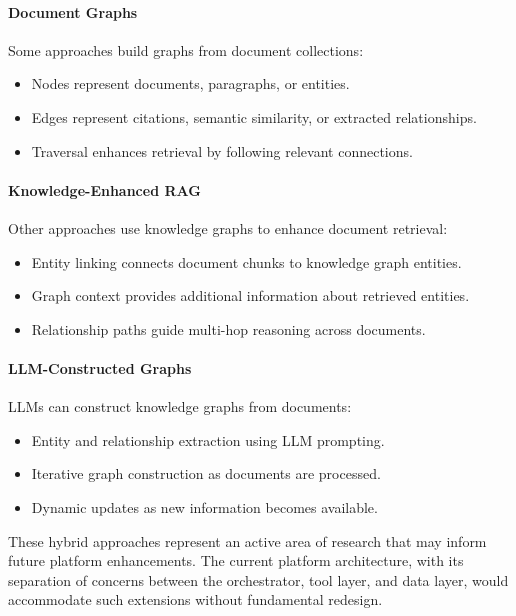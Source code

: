 \paragraph{Document Graphs}

Some approaches build graphs from document collections:
\begin{itemize}
    \item Nodes represent documents, paragraphs, or entities.
    \item Edges represent citations, semantic similarity, or extracted relationships.
    \item Traversal enhances retrieval by following relevant connections.
\end{itemize}

\paragraph{Knowledge-Enhanced RAG}

Other approaches use knowledge graphs to enhance document retrieval:
\begin{itemize}
    \item Entity linking connects document chunks to knowledge graph entities.
    \item Graph context provides additional information about retrieved entities.
    \item Relationship paths guide multi-hop reasoning across documents.
\end{itemize}

\paragraph{LLM-Constructed Graphs}

LLMs can construct knowledge graphs from documents:
\begin{itemize}
    \item Entity and relationship extraction using LLM prompting.
    \item Iterative graph construction as documents are processed.
    \item Dynamic updates as new information becomes available.
\end{itemize}

These hybrid approaches represent an active area of research that may inform future platform enhancements. The current platform architecture, with its separation of concerns between the orchestrator, tool layer, and data layer, would accommodate such extensions without fundamental redesign.

